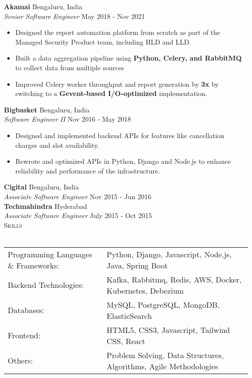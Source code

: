 \documentclass[a4paper]{article}
\newcommand{\lineunder} {
    \vspace*{-8pt} \\
    \hspace*{-18pt} \hrulefill \\
}
\newcommand{\header} [1] {
    {\hspace*{-18pt}\vspace*{6pt} \textsc{#1}}
    \vspace*{-6pt} \lineunder
}
\begin{document}
\textbf{Akamai} \hfill Bengaluru, India\\
\textit{Senior Software Engineer} \hfill May 2018 - Nov 2021\\
\vspace{-1mm}
\begin{itemize} \itemsep 1pt
	\item Designed the report automation platform from scratch as part of the Managed Security Product team, including HLD and LLD.
	\item Built a data aggregation pipeline using \textbf{Python, Celery, and RabbitMQ} to collect data from multiple sources
	\item Improved Celery worker throughput and report generation by \textbf{3x} by switching to a \textbf{Gevent-based I/O-optimized} implementation.
\end{itemize}
\textbf{Bigbasket} \hfill Bengaluru, India\\
\textit{Software Engineer II} \hfill Nov 2016 - May 2018\\
\vspace{-1mm}
\begin{itemize} \itemsep 1pt
	\item Designed and implemented backend APIs for features like cancellation charges and slot availability.
	\item Rewrote and optimized APIs in Python, Django and Node.js to enhance reliability and performance of the infrastructure.
\end{itemize}
\textbf{Cigital} \hfill Bengaluru, India\\
\textit{Associate Software Engineer} \hfill Nov 2015 - Jun 2016\\
\textbf{Techmahindra} \hfill Hyderabad\\
\textit{Associate Software Engineer} \hfill July 2015 - Oct 2015\\

\header{Skills}
\begin{tabular}{ l l }
	Programming Languages \& Frameworks: & Python, Django, Javascript, Node.js, Java, Spring Boot            \\
	Backend Technologies:                & Kafka, Rabbitmq, Redis, AWS, Docker, Kubernetes, Debezium         \\
	Databases:                           & MySQL, PostgreSQL, MongoDB, ElasticSearch                         \\
	Frontend:                            & HTML5, CSS3, Javascript, Tailwind CSS, React                      \\
	Others:                              & Problem Solving, Data Structures, Algorithms, Agile Methodologies \\
\end{tabular}
\vspace{2mm}
\end{document}
